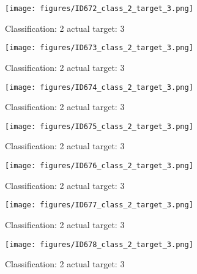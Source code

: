 \begin{figure}[h!]
\begin{center}
\texttt{[image: figures/ID672\_class\_2\_target\_3.png]}
\end{center}
\caption{ Classification: 2 actual target: 3}
\label{fig:ID672_class_2_target_3}
\end{figure}
\begin{figure}[h!]
\begin{center}
\texttt{[image: figures/ID673\_class\_2\_target\_3.png]}
\end{center}
\caption{ Classification: 2 actual target: 3}
\label{fig:ID673_class_2_target_3}
\end{figure}
\begin{figure}[h!]
\begin{center}
\texttt{[image: figures/ID674\_class\_2\_target\_3.png]}
\end{center}
\caption{ Classification: 2 actual target: 3}
\label{fig:ID674_class_2_target_3}
\end{figure}
\begin{figure}[h!]
\begin{center}
\texttt{[image: figures/ID675\_class\_2\_target\_3.png]}
\end{center}
\caption{ Classification: 2 actual target: 3}
\label{fig:ID675_class_2_target_3}
\end{figure}
\begin{figure}[h!]
\begin{center}
\texttt{[image: figures/ID676\_class\_2\_target\_3.png]}
\end{center}
\caption{ Classification: 2 actual target: 3}
\label{fig:ID676_class_2_target_3}
\end{figure}
\begin{figure}[h!]
\begin{center}
\texttt{[image: figures/ID677\_class\_2\_target\_3.png]}
\end{center}
\caption{ Classification: 2 actual target: 3}
\label{fig:ID677_class_2_target_3}
\end{figure}
\begin{figure}[h!]
\begin{center}
\texttt{[image: figures/ID678\_class\_2\_target\_3.png]}
\end{center}
\caption{ Classification: 2 actual target: 3}
\label{fig:ID678_class_2_target_3}
\end{figure}
